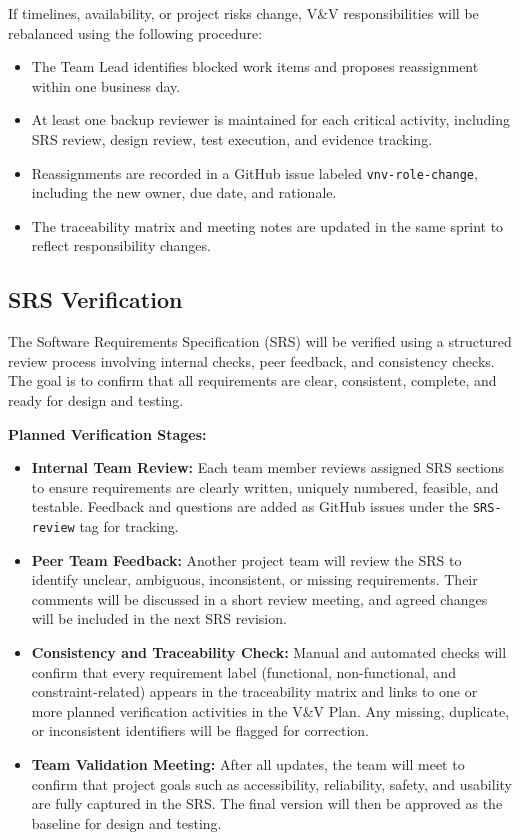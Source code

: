 \documentclass[12pt, titlepage]{article}
\begin{document}
If timelines, availability, or project risks change, V\&V
responsibilities will be rebalanced using the following procedure:
\begin{itemize}
  \item The Team Lead identifies blocked work items and proposes
  reassignment within one business day.
  \item At least one backup reviewer is maintained for each critical
  activity, including SRS review, design review, test execution, and
  evidence tracking.
  \item Reassignments are recorded in a GitHub issue labeled
  \texttt{vnv-role-change}, including the new owner, due date, and
  rationale.
  \item The traceability matrix and meeting notes are updated in the
  same sprint to reflect responsibility changes.
\end{itemize}

\subsection{SRS Verification}

The Software Requirements Specification (SRS) will be verified using a
structured review process involving internal checks, peer feedback, and
consistency checks. The goal is to confirm that all requirements are clear,
consistent, complete, and ready for design and testing.

\vspace{0.5em}
\noindent\textbf{Planned Verification Stages:}
\begin{itemize}
\item \textbf{Internal Team Review:}
  Each team member reviews assigned SRS sections to ensure requirements are
  clearly written, uniquely numbered, feasible, and testable. Feedback and
  questions are added as GitHub issues under the \texttt{SRS-review} tag for
  tracking.

\item \textbf{Peer Team Feedback:}
  Another project team will review the SRS to identify unclear, ambiguous,
  inconsistent, or missing requirements. Their comments will be discussed in
  a short review meeting, and agreed changes will be included in the next SRS
  revision.

\item \textbf{Consistency and Traceability Check:}
  Manual and automated checks will confirm that every requirement label
  (functional, non-functional, and constraint-related) appears in the
  traceability matrix and links to one or more planned verification
  activities in the V\&V Plan. Any missing, duplicate, or inconsistent
  identifiers will be flagged for correction.

\item \textbf{Team Validation Meeting:}
  After all updates, the team will meet to confirm that project goals such as
  accessibility, reliability, safety, and usability are fully captured in the
  SRS. The final version will then be approved as the baseline for design and
  testing.
\end{itemize}
\end{document}
